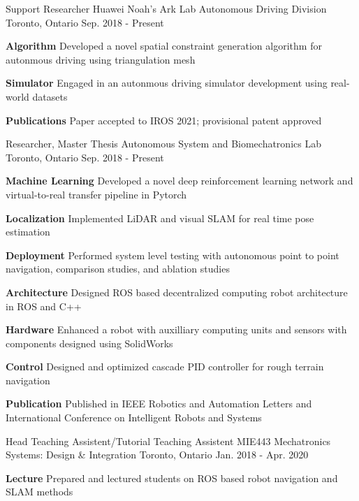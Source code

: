 \begin{cventries}
	\cventry
	{Support Researcher}
	{Huawei Noah’s Ark Lab Autonomous Driving Division}
	{Toronto, Ontario}
	{Sep. 2018 - Present}
	{
		\begin{cvitems}
			\item {
				\textbf{Algorithm} Developed a novel spatial constraint generation algorithm for autonmous driving using triangulation mesh
			}
			\item {
				\textbf{Simulator} Engaged in an autonmous driving simulator development using real-world datasets
			}
			\item{
				\textbf{Publications} Paper accepted to IROS 2021; provisional patent approved
			}
		\end{cvitems}
	}
	\cventry
	{Researcher, Master Thesis}
	{Autonomous System and Biomechatronics Lab}
	{Toronto, Ontario}
	{Sep. 2018 - Present}
	{
		\begin{cvitems}
			\item {
				\textbf{Machine Learning} Developed a novel deep reinforcement learning network and virtual-to-real transfer pipeline in Pytorch
			}
			\item {
				\textbf{Localization} Implemented LiDAR and visual SLAM for real time pose estimation
			}
			\item {
				\textbf{Deployment} Performed system level testing with autonomous point to point navigation, comparison studies, and ablation studies
			}
			\item {
				\textbf{Architecture} Designed ROS based decentralized computing robot architecture in ROS and C++
			}
			\item {
				\textbf{Hardware} Enhanced a robot with auxilliary computing units and sensors with components designed using SolidWorks
			}
			\item {
				\textbf{Control} Designed and optimized cascade PID controller for rough terrain navigation
			}
			\item {
				\textbf{Publication} Published in IEEE Robotics and Automation Letters and International Conference on Intelligent Robots and Systems
			}
		\end{cvitems}
	}
	\cventry
	{Head Teaching Assistent/Tutorial Teaching Assistent}
	{MIE443 Mechatronics Systems: Design \& Integration}
	{Toronto, Ontario}
	{Jan. 2018 - Apr. 2020}
	{
		\begin{cvitems}
			\item {
				\textbf{Lecture} Prepared and lectured students on ROS based robot navigation and SLAM methods
}
\end{cvitems}}
\end{cventries}
